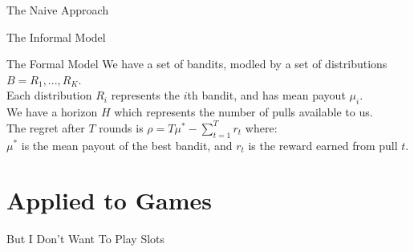 \documentclass{powerdot}
\begin{document}
\begin{slide}{The Naive Approach}
\end{slide}

\begin{slide}{The Informal Model}
\end{slide}

\begin{slide}{The Formal Model}
  We have a set of bandits, modled by a set of distributions $B = {R_1, ..., R_K}$.\\
  Each distribution $R_i$ represents the $i$th bandit, and has mean payout $\mu_i$.\\
  We have a horizon $H$ which represents the number of pulls available to us.\\
  The regret after $T$ rounds is $\rho = T\mu^* - \sum_{t=1}^{T}r_t$ where:\\
  $\mu^*$ is the mean payout of the best bandit, and $r_t$ is the reward earned
  from pull $t$.
\end{slide}

\section{Applied to Games}

\begin{slide}{But I Don't Want To Play Slots}
\end{slide}
\end{document}
